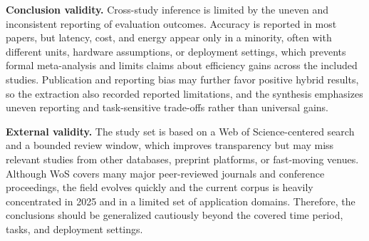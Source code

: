 \textbf{Conclusion validity.} Cross-study inference is limited by the uneven and inconsistent reporting of evaluation outcomes. Accuracy is reported in most papers, but latency, cost, and energy appear only in a minority, often with different units, hardware assumptions, or deployment settings, which prevents formal meta-analysis and limits claims about efficiency gains across the included studies. Publication and reporting bias may further favor positive hybrid results, so the extraction also recorded reported limitations, and the synthesis emphasizes uneven reporting and task-sensitive trade-offs rather than universal gains.

\textbf{External validity.} The study set is based on a Web of Science-centered search and a bounded review window, which improves transparency but may miss relevant studies from other databases, preprint platforms, or fast-moving venues. Although WoS covers many major peer-reviewed journals and conference proceedings, the field evolves quickly and the current corpus is heavily concentrated in 2025 and in a limited set of application domains. Therefore, the conclusions should be generalized cautiously beyond the covered time period, tasks, and deployment settings.
